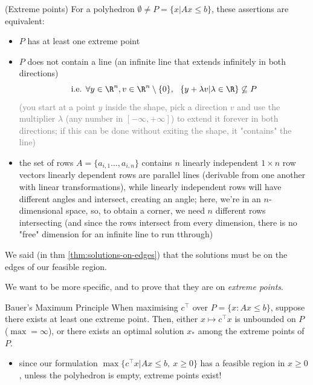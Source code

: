 \documentclass[a4paper, 11pt]{report}
\newcommand{\Rn}{\R^{n}}
\begin{document}
\begin{thmframe}{(Extreme points)}{}
    For a polyhedron $\emptyset \neq P = \{x | Ax \leq  b\}$, these assertions are equivalent:
    \begin{itemize}
        \item $P$ has at least one extreme point
        \item $P$ does not contain a line (an infinite line that extends infinitely in both directions)
            \vspace{-0.5em}
            $$\text{i.e. } \forall y \in \Rn, v \in \Rn \setminus \{0\}, \ \ \{y +\lambda v | \lambda \in \R\}\not \subseteq P$$
            \vspace{-1em}
            \subitem \textcolor{gray}{(you start at a point $y$ inside the shape, pick a direction $v$ and use the multiplier $\lambda$ (any number in $[-\infty, +\infty]$) to extend it forever in both directions; if this can be done without exiting the shape, it "contains" the line)}
        \item the set of rows $A = \{a_{i, 1} \dots, a_{i,n}\}$ contains $n$ linearly independent $1 \times n $ row vectors
            \subitem \color{gray} linearly dependent rows are parallel lines (derivable from one another with linear transformations), while linearly independent rows will have different angles and intersect, creating an angle; here, we're in an $n$-dimensional space, so, to obtain a corner, we need $n$ different rows intersecting (and since the rows intersect from every dimension, there is no "free" dimension for an infinite line to run tthrough)
    \end{itemize}
\end{thmframe}

We said (in thm \ref{thm:solutions-on-edges}) that the solutions must be on the edges of our feasible region.

We want to be more specific, and to prove that they are on \textit{extreme points}.

\begin{thmframe}{Bauer's Maximum Principle}{}
    When maximising $c^\top $ over $P = \{x : Ax \leq b\}$, suppose there exists at least one extreme point. Then, either $x \mapsto c^\top x$ is unbounded on $P$ ($\max = \infty$), or there exists an optimal solution $x_{*}$ among the extreme points of $P$.
\end{thmframe}

\begin{itemize}
    \item since our formulation $\max\{c^\top x | Ax \leq b, \ x \geq 0\}$ has a feasible region in $x \geq 0$, unless the polyhedron is empty, extreme points exist!
\end{itemize}
\end{document}
